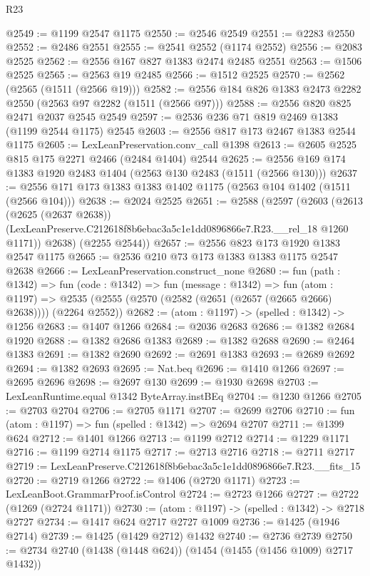 \begin{lexlean}{R23}
\begin{coremodule}
@2549 := @1199 @2547 @1175
@2550 := @2546 @2549
@2551 := @2283 @2550
@2552 := @2486 @2551
@2555 := @2541 @2552 (@1174 @2552)
@2556 := @2083 @2525
@2562 := @2556 @167 @827 @1383 @2474 @2485 @2551
@2563 := @1506 @2525
@2565 := @2563 @19 @2485
@2566 := @1512 @2525
@2570 := @2562 (@2565 (@1511 (@2566 @19)))
@2582 := @2556 @184 @826 @1383 @2473 @2282 @2550 (@2563 @97 @2282 (@1511 (@2566 @97)))
@2588 := @2556 @820 @825 @2471 @2037 @2545 @2549
@2597 := @2536 @236 @71 @819 @2469 @1383 (@1199 @2544 @1175) @2545
@2603 := @2556 @817 @173 @2467 @1383 @2544 @1175
@2605 := LexLeanPreservation.conv_call @1398
@2613 := @2605 @2525 @815 @175 @2271 @2466 (@2484 @1404) @2544
@2625 := @2556 @169 @174 @1383 @1920 @2483 @1404 (@2563 @130 @2483 (@1511 (@2566 @130)))
@2637 := @2556 @171 @173 @1383 @1383 @1402 @1175 (@2563 @104 @1402 (@1511 (@2566 @104)))
@2638 := @2024 @2525
@2651 := @2588
    (@2597
      (@2603
        (@2613
          (@2625 (@2637 @2638))
          (LexLeanPreserve.C212618f8b6ebac3a5c1e1dd0896866e7.R23.__rel_18 @1260 @1171))
        @2638)
      (@2255 @2544))
@2657 := @2556 @823 @173 @1920 @1383 @2547 @1175
@2665 := @2536 @210 @73 @173 @1383 @1383 @1175 @2547 @2638
@2666 := LexLeanPreservation.construct_none
@2680 := fun (path : @1342) =>
  fun (code : @1342) =>
  fun (message : @1342) =>
  fun (atom : @1197) =>
  @2535 (@2555 (@2570 (@2582 (@2651 (@2657 (@2665 @2666) @2638)))) (@2264 @2552))
@2682 := (atom : @1197) -> (spelled : @1342) -> @1256
@2683 := @1407 @1266
@2684 := @2036 @2683
@2686 := @1382 @2684 @1920
@2688 := @1382 @2686 @1383
@2689 := @1382 @2688
@2690 := @2464 @1383
@2691 := @1382 @2690
@2692 := @2691 @1383
@2693 := @2689 @2692
@2694 := @1382 @2693
@2695 := Nat.beq
@2696 := @1410 @1266
@2697 := @2695 @2696
@2698 := @2697 @130
@2699 := @1930 @2698
@2703 := LexLeanRuntime.equal @1342 ByteArray.instBEq
@2704 := @1230 @1266
@2705 := @2703 @2704
@2706 := @2705 @1171
@2707 := @2699 @2706
@2710 := fun (atom : @1197) => fun (spelled : @1342) => @2694 @2707
@2711 := @1399 @624
@2712 := @1401 @1266
@2713 := @1199 @2712
@2714 := @1229 @1171
@2716 := @1199 @2714 @1175
@2717 := @2713 @2716
@2718 := @2711 @2717
@2719 := LexLeanPreserve.C212618f8b6ebac3a5c1e1dd0896866e7.R23.__fits_15
@2720 := @2719 @1266
@2722 := @1406 (@2720 @1171)
@2723 := LexLeanBoot.GrammarProof.isControl
@2724 := @2723 @1266
@2727 := @2722 (@1269 (@2724 @1171))
@2730 := (atom : @1197) -> (spelled : @1342) -> @2718 @2727
@2734 := @1417 @624 @2717 @2727 @1009
@2736 := @1425 (@1946 @2714)
@2739 := @1425 (@1429 @2712) @1432
@2740 := @2736 @2739
@2750 := @2734 @2740 (@1438 (@1448 @624)) (@1454 (@1455 (@1456 @1009) @2717 @1432))

\end{coremodule}
\end{lexlean}
